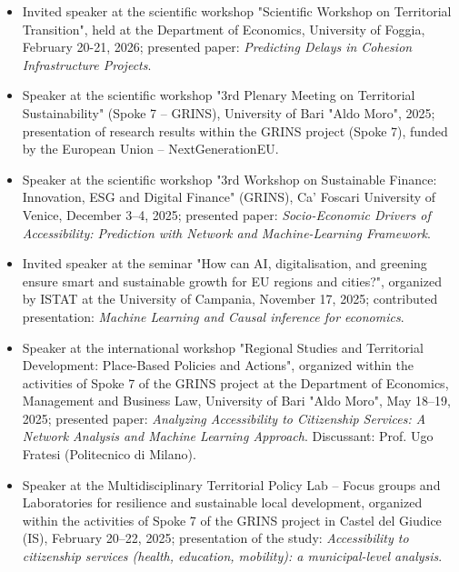 \documentclass[11pt,a4paper,sans]{moderncv} %
\begin{document}
\vspace{6pt}

\begin{itemize}


\item Invited speaker at the scientific workshop "Scientific Workshop on Territorial Transition", held at the Department of Economics, University of Foggia, February 20-21, 2026; presented paper: \textit{Predicting Delays in Cohesion Infrastructure Projects}.


\item Speaker at the scientific workshop "3rd Plenary Meeting on Territorial Sustainability" (Spoke 7 – GRINS), University of Bari "Aldo Moro", 2025; presentation of research results within the GRINS project (Spoke 7), funded by the European Union – NextGenerationEU.


\item Speaker at the scientific workshop "3rd Workshop on Sustainable Finance: Innovation, ESG and Digital Finance" (GRINS), Ca' Foscari University of Venice, December 3–4, 2025; presented paper: \textit{Socio-Economic Drivers of Accessibility: Prediction with Network and Machine-Learning Framework}.


    \item Invited speaker at the seminar "How can AI, digitalisation, and greening ensure smart and sustainable growth for EU regions and cities?", organized by ISTAT at the University of Campania, November 17, 2025; contributed presentation: \textit{Machine Learning and Causal inference for economics}.


    \item Speaker at the international workshop "Regional Studies and Territorial Development: Place-Based Policies and Actions", organized within the activities of Spoke 7 of the GRINS project at the Department of Economics, Management and Business Law, University of Bari "Aldo Moro", May 18–19, 2025; presented paper: \textit{Analyzing Accessibility to Citizenship Services: A Network Analysis and Machine Learning Approach}. Discussant: Prof. Ugo Fratesi (Politecnico di Milano).


    
    \item Speaker at the Multidisciplinary Territorial Policy Lab – Focus groups and Laboratories for resilience and sustainable local development, organized within the activities of Spoke 7 of the GRINS project in Castel del Giudice (IS), February 20–22, 2025; presentation of the study: \textit{Accessibility to citizenship services (health, education, mobility): a municipal-level analysis}.



\end{itemize}
\end{document}
